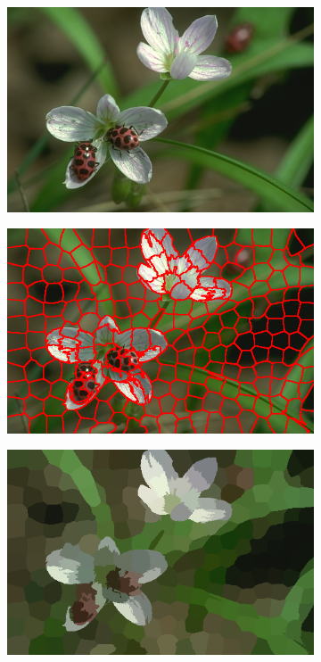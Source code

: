 \documentclass[12pt,a4paper,oneside]{article}
\begin{document}
\begin{figure}[!htb]
\begin{subfigure}[t]{.325\textwidth}
	\end{subfigure}%
	\vspace{.01\textwidth}
	\begin{subfigure}[t]{.325\textwidth}
		\includegraphics[width=\textwidth]{resources/images/es2_superpixel_originale.png}	
	\end{subfigure}%
	\hfill
	\begin{subfigure}[t]{.325\textwidth}
		\includegraphics[width=\textwidth]{resources/images/es2_superpixel_contorni.png}
	\end{subfigure}%
	\hfill
	\begin{subfigure}[t]{.325\textwidth}
		\includegraphics[width=\textwidth]{resources/images/es2_superpixel_superpixel.png}

\end{subfigure}
\end{figure}
\end{document}
